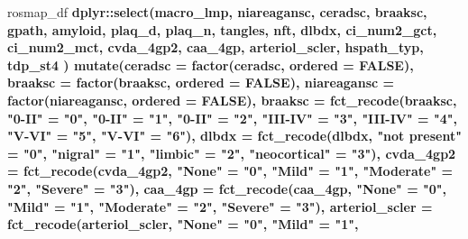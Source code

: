 \documentclass[]{book}
\newenvironment{Shaded}{\begin{snugshade}}{\end{snugshade}}
\newcommand{\DataTypeTok}[1]{\textcolor[rgb]{0.13,0.29,0.53}{#1}}
\newcommand{\KeywordTok}[1]{\textcolor[rgb]{0.13,0.29,0.53}{\textbf{#1}}}
\newcommand{\NormalTok}[1]{#1}
\newcommand{\OperatorTok}[1]{\textcolor[rgb]{0.81,0.36,0.00}{\textbf{#1}}}
\newcommand{\OtherTok}[1]{\textcolor[rgb]{0.56,0.35,0.01}{#1}}
\newcommand{\StringTok}[1]{\textcolor[rgb]{0.31,0.60,0.02}{#1}}
\begin{document}
\begin{Shaded}
\begin{Highlighting}[]
\NormalTok{rosmap_df }\OperatorTok{%>%}\StringTok{ }
\StringTok{  }\NormalTok{dplyr}\OperatorTok{::}\KeywordTok{select}\NormalTok{(macro_lmp, niareagansc, ceradsc, braaksc, gpath, amyloid, plaq_d, plaq_n, tangles, nft,}
\NormalTok{         dlbdx, ci_num2_gct, ci_num2_mct, cvda_4gp2, caa_4gp, arteriol_scler, hspath_typ, tdp_st4}
\NormalTok{         ) }\OperatorTok{%>%}\StringTok{ }
\StringTok{  }\KeywordTok{mutate}\NormalTok{(}\DataTypeTok{ceradsc =} \KeywordTok{factor}\NormalTok{(ceradsc, }\DataTypeTok{ordered =} \OtherTok{FALSE}\NormalTok{),}
         \DataTypeTok{braaksc =} \KeywordTok{factor}\NormalTok{(braaksc, }\DataTypeTok{ordered =} \OtherTok{FALSE}\NormalTok{), }
         \DataTypeTok{niareagansc =} \KeywordTok{factor}\NormalTok{(niareagansc, }\DataTypeTok{ordered =} \OtherTok{FALSE}\NormalTok{), }
         \DataTypeTok{braaksc =} \KeywordTok{fct_recode}\NormalTok{(braaksc, }\StringTok{"0-II"}\NormalTok{ =}\StringTok{ "0"}\NormalTok{, }\StringTok{"0-II"}\NormalTok{ =}\StringTok{ "1"}\NormalTok{, }\StringTok{"0-II"}\NormalTok{ =}\StringTok{ "2"}\NormalTok{, }
                              \StringTok{"III-IV"}\NormalTok{ =}\StringTok{ "3"}\NormalTok{, }\StringTok{"III-IV"}\NormalTok{ =}\StringTok{ "4"}\NormalTok{, }\StringTok{"V-VI"}\NormalTok{ =}\StringTok{ "5"}\NormalTok{, }\StringTok{"V-VI"}\NormalTok{ =}\StringTok{ "6"}\NormalTok{), }
         \DataTypeTok{dlbdx =} \KeywordTok{fct_recode}\NormalTok{(dlbdx, }\StringTok{"not present"}\NormalTok{ =}\StringTok{ "0"}\NormalTok{, }\StringTok{"nigral"}\NormalTok{ =}\StringTok{ "1"}\NormalTok{, }
                            \StringTok{"limbic"}\NormalTok{ =}\StringTok{ "2"}\NormalTok{, }\StringTok{"neocortical"}\NormalTok{ =}\StringTok{ "3"}\NormalTok{), }
         \DataTypeTok{cvda_4gp2 =} \KeywordTok{fct_recode}\NormalTok{(cvda_4gp2, }\StringTok{"None"}\NormalTok{ =}\StringTok{ "0"}\NormalTok{, }\StringTok{"Mild"}\NormalTok{ =}\StringTok{ "1"}\NormalTok{, }
                            \StringTok{"Moderate"}\NormalTok{ =}\StringTok{ "2"}\NormalTok{, }\StringTok{"Severe"}\NormalTok{ =}\StringTok{ "3"}\NormalTok{),}
         \DataTypeTok{caa_4gp =} \KeywordTok{fct_recode}\NormalTok{(caa_4gp, }\StringTok{"None"}\NormalTok{ =}\StringTok{ "0"}\NormalTok{, }\StringTok{"Mild"}\NormalTok{ =}\StringTok{ "1"}\NormalTok{, }
                            \StringTok{"Moderate"}\NormalTok{ =}\StringTok{ "2"}\NormalTok{, }\StringTok{"Severe"}\NormalTok{ =}\StringTok{ "3"}\NormalTok{),}
         \DataTypeTok{arteriol_scler =} \KeywordTok{fct_recode}\NormalTok{(arteriol_scler, }\StringTok{"None"}\NormalTok{ =}\StringTok{ "0"}\NormalTok{, }\StringTok{"Mild"}\NormalTok{ =}\StringTok{ "1"}\NormalTok{, }
}}
\end{Highlighting}
\end{Shaded}
\end{document}
